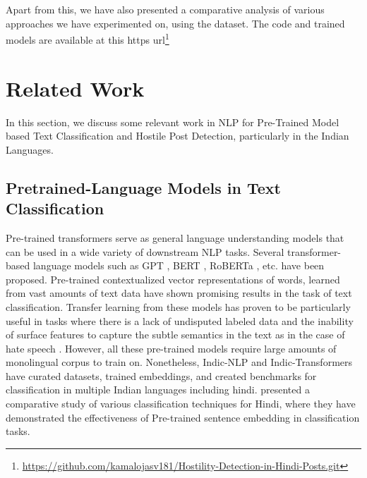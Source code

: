 \documentclass[runningheads]{llncs}
\begin{document}
Apart from this, we have also presented a comparative analysis of various approaches we have experimented on, using the dataset. The code and trained models are available at this https url\footnote{\url{https://github.com/kamalojasv181/Hostility-Detection-in-Hindi-Posts.git}}

\section{Related Work}

In this section, we discuss some relevant work in NLP for Pre-Trained Model based Text Classification and Hostile Post Detection, particularly in the Indian Languages.

\subsection*{Pretrained-Language Models in Text Classification} Pre-trained transformers serve as general language understanding models that can be used in a wide variety of downstream NLP tasks. Several transformer-based language models such as GPT \cite{ref_Radford2018}, BERT \cite{devlin-etal-2019-bert}, RoBERTa \cite{DBLP:journals/corr/abs-1907-11692}, etc. have been proposed. Pre-trained contextualized vector representations of words, learned from vast amounts of text data have shown promising results in the task of text classification. Transfer learning from these models has proven to be particularly useful in tasks where there is a lack of undisputed labeled data and the inability of surface features to capture the subtle semantics in the text as in the case of hate speech \cite{ref_hate}. However, all these pre-trained models require large amounts of monolingual corpus to train on. Nonetheless, Indic-NLP \cite{ref_indic_Nlp} and Indic-Transformers \cite{jain2020indictransformers} have curated datasets, trained embeddings, and created benchmarks for classification in multiple Indian languages including hindi. \cite{Joshi_2020} presented a comparative study of various classification techniques for Hindi, where they have demonstrated the effectiveness of Pre-trained sentence embedding in classification tasks.     
\end{document}

